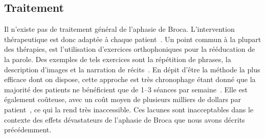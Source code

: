 \subsection{Traitement}

Il n'existe pas de traitement général de l'aphasie de Broca.
L'intervention thérapeutique est donc adaptée à chaque patient~\cite{Acharya_Wroten_2022}.
Un point commun à la plupart des thérapies, 
est l'utilisation d'exercices orthophoniques pour la rééducation de la parole.
Des exemples de tels exercices sont 
la répétition de phrases, la description d'images et la narration de récits~\cite{recover}.
En dépit d'être la méthode la plus efficace dont on dispose,
cette approche est très chronophage étant donné que 
la majorité des patients ne bénéficient que de 1--3 séances par semaine~\cite{recover}.
Elle est également coûteuse, 
avec un coût moyen de plusieurs milliers de dollars par patient~\cite{Liu_Huang_Xu_Wu_Tao_Chen_2021,Jacobs_Ellis_2021},
ce qui la rend très inaccessible.
Ces lacunes sont inacceptables dans le contexte des 
effets dévastateurs de l'aphasie de Broca que nous avons décrits précédemment.